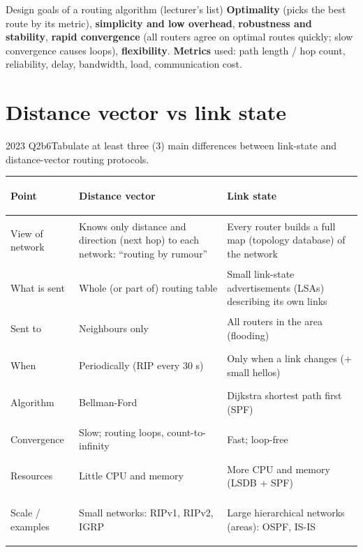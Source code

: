 \documentclass[10pt]{article}
\begin{document}
\begin{keydef}{Design goals of a routing algorithm (lecturer's list)}
\textbf{Optimality} (picks the best route by its metric), \textbf{simplicity and low overhead}, \textbf{robustness and stability}, \textbf{rapid convergence} (all routers agree on optimal routes quickly; slow convergence causes loops), \textbf{flexibility}.
\textbf{Metrics} used: path length / hop count, reliability, delay, bandwidth, load, communication cost.
\end{keydef}

\section{Distance vector vs link state}

\begin{pastq}{2023 Q2b}{6}Tabulate at least three (3) main differences between link-state and distance-vector routing protocols.\end{pastq}
\begin{ans}
\small
\begin{tabularx}{\linewidth}{@{}>{\bfseries\raggedright\arraybackslash}p{2.3cm}XX@{}}
\toprule
Point & Distance vector & Link state\\\midrule
View of network & Knows only distance and direction (next hop) to each network: ``routing by rumour'' & Every router builds a full map (topology database) of the network\\
What is sent & Whole (or part of) routing table & Small link-state advertisements (LSAs) describing its own links\\
Sent to & Neighbours only & All routers in the area (flooding)\\
When & Periodically (RIP every 30 s) & Only when a link changes (+ small hellos)\\
Algorithm & Bellman-Ford & Dijkstra shortest path first (SPF)\\
Convergence & Slow; routing loops, count-to-infinity & Fast; loop-free\\
Resources & Little CPU and memory & More CPU and memory (LSDB + SPF)\\
Scale / examples & Small networks: RIPv1, RIPv2, IGRP & Large hierarchical networks (areas): OSPF, IS-IS\\
\bottomrule
\end{tabularx}
\end{ans}
\end{document}
